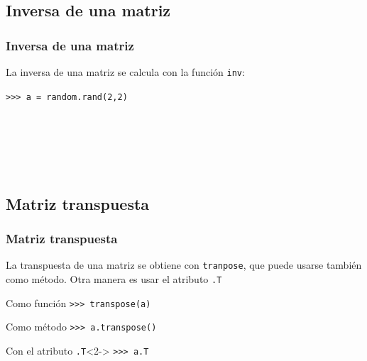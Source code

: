 \subsection{Inversa de una matriz}
\begin{frame}[fragile]
\frametitle{Inversa de una matriz}
La inversa de una matriz se calcula con la funci\'{o}n \texttt{inv}:
\begin{exampleblock}{}
\fontsize{12}{12}\selectfont
\verb|>>> a = random.rand(2,2)| \\
 \\
\\
 \\
 \\
 \\
\end{exampleblock}
\end{frame}
\subsection{Matriz transpuesta}
\begin{frame}[fragile]
\frametitle{Matriz transpuesta}
La transpuesta de una matriz se obtiene con \texttt{tranpose}, que puede usarse tambi\'{e}n como m\'{e}todo. Otra manera es usar el atributo \texttt{.T}
\begin{exampleblock}{Como funci\'{o}n}
\verb|>>> transpose(a)| \\
\end{exampleblock}
\end{frame}
\begin{frame}[fragile]
\begin{exampleblock}{Como m\'{e}todo}
\verb|>>> a.transpose()| \\
\end{exampleblock}
\begin{exampleblock}{Con el atributo \texttt{.T}}<2->
\verb|>>> a.T| \\
\end{exampleblock}
\end{frame}
